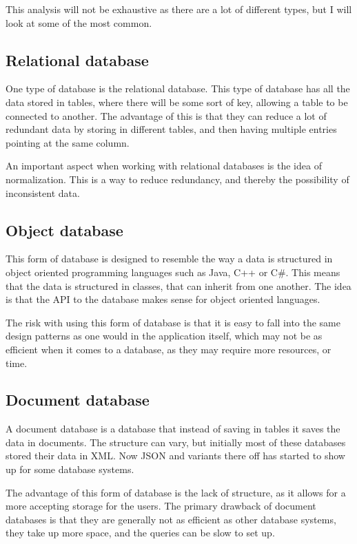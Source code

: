 This analysis will not be exhaustive as there are a lot of different types, but I will look at some of the most common.

\subsection{Relational database}
\label{sub:Relational database}
One type of database is the relational database. This type of database has all the data stored in tables, where there will be some sort of key, allowing a table to be connected to another. The advantage of this is that they can reduce a lot of redundant data by storing in different tables, and then having multiple entries pointing at the same column\cite{ibm:choosing_dbms}.

An important aspect when working with relational databases is the idea of normalization. This is a way to reduce redundancy, and thereby the possibility of inconsistent data.

\subsection{Object database}
\label{sub:Object database}
This form of database is designed to resemble the way a data is structured in object oriented programming languages such as Java, C++ or C\#. This means that the data is structured in classes, that can inherit from one another. The idea is that the API to the database makes sense for object oriented languages.

The risk with using this form of database is that it is easy to fall into the same design patterns as one would in the application itself, which may not be as efficient when it comes to a database, as they may require more resources, or time\cite{ibm:choosing_dbms}.

\subsection{Document database}
\label{sub:Document database}
A document database is a database that instead of saving in tables it saves the data in documents. The structure can vary, but initially most of these databases stored their data in XML\cite{ibm:choosing_dbms}. Now JSON and variants there off has started to show up for some database systems.

The advantage of this form of database is the lack of structure, as it allows for a more accepting storage for the users. The primary drawback of document databases is that they are generally not as efficient as other database systems, they take up more space, and the queries can be slow to set up\cite{ibm:choosing_dbms}.

